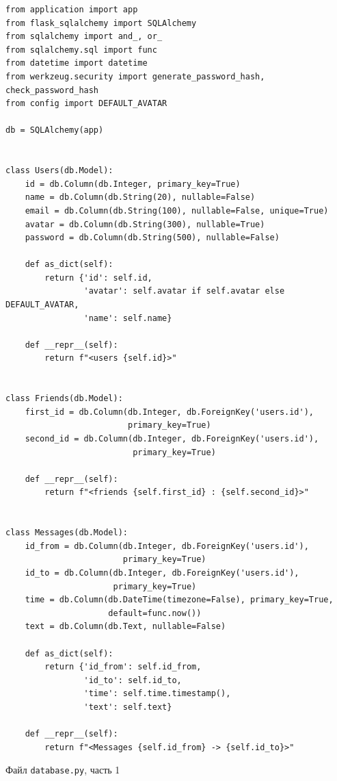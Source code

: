 \documentclass[14pt,final]{report}
\begin{document}
\begin{listing}[htbp]
\begin{center}
{\footnotesize
\begin{verbatim}
from application import app
from flask_sqlalchemy import SQLAlchemy
from sqlalchemy import and_, or_
from sqlalchemy.sql import func
from datetime import datetime
from werkzeug.security import generate_password_hash, check_password_hash
from config import DEFAULT_AVATAR

db = SQLAlchemy(app)


class Users(db.Model):
    id = db.Column(db.Integer, primary_key=True)
    name = db.Column(db.String(20), nullable=False)
    email = db.Column(db.String(100), nullable=False, unique=True)
    avatar = db.Column(db.String(300), nullable=True)
    password = db.Column(db.String(500), nullable=False)

    def as_dict(self):
        return {'id': self.id,
                'avatar': self.avatar if self.avatar else DEFAULT_AVATAR,
                'name': self.name}

    def __repr__(self):
        return f"<users {self.id}>"


class Friends(db.Model):
    first_id = db.Column(db.Integer, db.ForeignKey('users.id'),
                         primary_key=True)
    second_id = db.Column(db.Integer, db.ForeignKey('users.id'),
                          primary_key=True)

    def __repr__(self):
        return f"<friends {self.first_id} : {self.second_id}>"


class Messages(db.Model):
    id_from = db.Column(db.Integer, db.ForeignKey('users.id'),
                        primary_key=True)
    id_to = db.Column(db.Integer, db.ForeignKey('users.id'),
                      primary_key=True)
    time = db.Column(db.DateTime(timezone=False), primary_key=True,
                     default=func.now())
    text = db.Column(db.Text, nullable=False)

    def as_dict(self):
        return {'id_from': self.id_from,
                'id_to': self.id_to,
                'time': self.time.timestamp(),
                'text': self.text}

    def __repr__(self):
        return f"<Messages {self.id_from} -> {self.id_to}>"

\end{verbatim}}
\end{center}
\caption{Файл \texttt{database.py}, часть 1}\label{lst:db1}
\end{listing}
\end{document}
